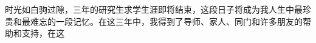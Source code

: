 \begin{acknowledgement}
时光如白驹过隙，三年的研究生求学生涯即将结束，这段日子将成为我人生中最珍贵和最难忘的一段记忆。在这三年中，我得到了导师、家人、同门和许多朋友的帮助和支持，在这

\end{acknowledgement}
